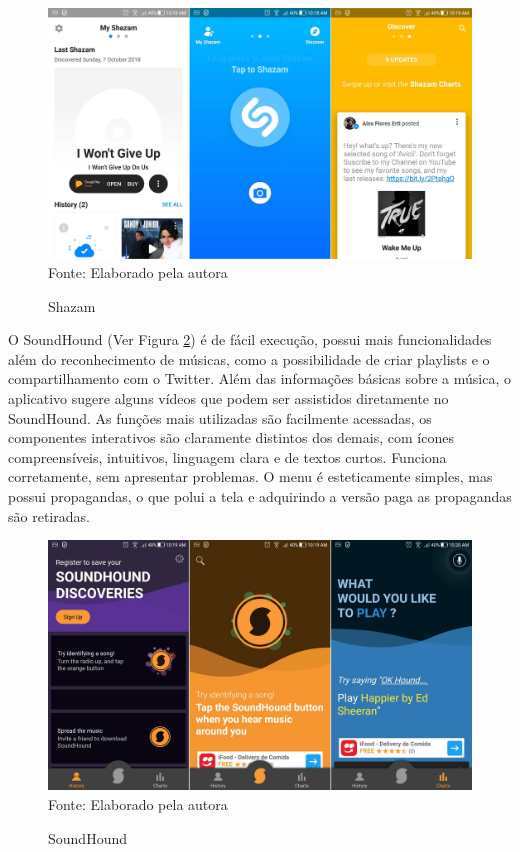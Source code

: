 \begin{figure}[!htb]
   \centering
   \caption{Shazam}\label{fig:shazam} 
   \includegraphics[scale=0.17]{figuras/shazam.jpg}
   \\Fonte: Elaborado pela autora
\end{figure}

O SoundHound (Ver Figura \ref{fig:soundHound}) é de fácil execução, possui mais funcionalidades além do reconhecimento de músicas, como a possibilidade de criar playlists e o compartilhamento com o Twitter. Além das informações básicas sobre a música, o aplicativo sugere alguns vídeos que podem ser assistidos diretamente no SoundHound. As funções mais utilizadas são facilmente acessadas, os componentes interativos são claramente distintos dos demais, com ícones compreensíveis, intuitivos, linguagem clara e de textos curtos. Funciona corretamente, sem apresentar problemas. O menu é esteticamente simples, mas possui propagandas, o que polui a tela e adquirindo a versão paga as propagandas são retiradas.

\begin{figure}[!htb]
   \centering
   \caption{SoundHound}\label{fig:soundHound} 
   \includegraphics[scale=0.17]{figuras/soundhound.jpg}
   \\Fonte: Elaborado pela autora
\end{figure}

